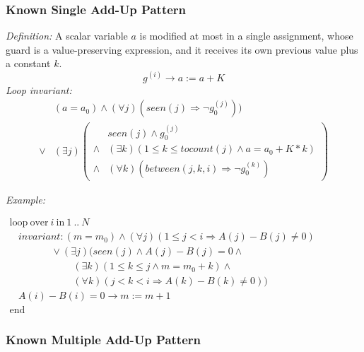 \documentclass[a4paper,10pt]{article}
\newcommand{\idx}{\ensuremath{i}\xspace}
\newcommand{\at}[1]{{(#1)}}
\newcommand{\KWloop}{\ensuremath{\mathrm{loop}~}}
\newcommand{\KWend}{\ensuremath{\mathrm{end}~}}
\newcommand{\KWover}{\ensuremath{\mathrm{over}~}}
\newcommand{\KWin}{\ensuremath{~\mathrm{in}~}}
\newcommand{\impl}{\ensuremath{\Longrightarrow}}
\newcommand{\seen}[1]{\ensuremath{\mathit{seen}(#1)}\xspace}
\newcommand{\tocount}[1]{\ensuremath{\mathit{tocount}(#1)}\xspace}
\newcommand{\between}[3]{\ensuremath{\mathit{between}{(#1,#2,#3)}}\xspace}
\newcommand{\loopinvariant}{\noindent\textit{Loop invariant:}\xspace}
\newcommand{\patterndef}{\noindent\textit{Definition:}\xspace}
\newcommand{\patternexample}{\noindent\textit{Example:}\xspace}
\begin{document}
\subsubsection*{Known Single Add-Up Pattern}

\patterndef A scalar variable $a$ is modified at most in a single assignment, whose
guard is a value-preserving expression, and it receives its own previous value plus a constant $k$.
%
$$g^\at{\idx} \rightarrow a := a + K$$
%
\loopinvariant
%
\begin{eqnarray*}
&(a = a_0) \land (\forall j)(\seen{j} \impl \neg g_0^\at{j})) \\
\lor 
& (\exists j)
\left(\begin{array}{cl}
&\seen{j} \land g_0^\at{j}\\
 \land& (\exists k)(1 \leq k \leq \tocount{j} \land a = a_0 + K * k) \\
\land& (\forall k)(\between{j}{k}{\idx} \impl \neg g_0^\at{k})
\end{array}\right)
\end{eqnarray*}

\bigskip
\patternexample

\medskip
$\begin{array}{l}
  \KWloop \KWover i \KWin 1~..~N \\
  ~~~~ \textit{invariant}: (m = m_0) \land (\forall j)(1\leq j < i \impl A(j)-B(j)\neq0)\\
  ~~~~~~~~~~~~~~~~~~~ \lor (\exists j)(\seen{j} \land A(j)-B(j)= 0 \land \\
  ~~~~~~~~~~~~~~~~~~~~~~~~~~~~~ (\exists k)(1 \leq k \leq j \land m = m_0 + k) \land\\
  ~~~~~~~~~~~~~~~~~~~~~~~~~~~~~ (\forall k)(j < k < i \impl A(k)-B(k)\neq0))\\
  ~~~~ A(i)-B(i)=0 \rightarrow m := m+1\\
  \KWend
\end{array}$

\subsubsection*{Known Multiple Add-Up Pattern}
\end{document}

